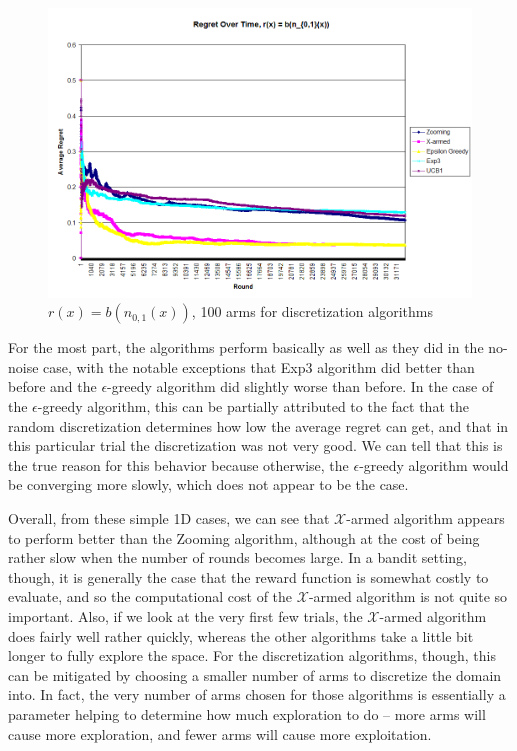 \begin{figure}[!ht]
  \begin{center}
    \includegraphics[width=\figwidth]{figures/1dnoiseplot.png}
     \caption{$r(x) = b(n_{0,1}(x))$, 100 arms for discretization
     algorithms}
     \label{fig:1dnoise}
  \end{center}
\end{figure}

For the most part, the algorithms perform basically as well as they did
in the no-noise case, with the notable exceptions that Exp3 algorithm did
better than before and the $\epsilon$-greedy algorithm did slightly worse
than before.  In the case of the $\epsilon$-greedy algorithm, this can be
partially attributed to the fact that the random discretization determines
how low the average regret can get, and that in this particular trial
the discretization was not very good.  We can tell that this is the true
reason for this behavior because otherwise, the $\epsilon$-greedy algorithm
would be converging more slowly, which does not appear to be the case.

Overall, from these simple 1D cases, we can see that
$\mathcal{X}$-armed algorithm appears to perform better than the Zooming
algorithm, although at the cost of being rather slow when the number of
rounds becomes large.  In a bandit setting, though, it is generally the
case that the reward function is somewhat costly to evaluate, and so the
computational cost of the $\mathcal{X}$-armed algorithm is not quite so
important.  Also, if we look at the very first few trials, the
$\mathcal{X}$-armed algorithm does fairly well rather quickly, whereas
the other algorithms take a little bit longer to fully explore the space.
For the discretization algorithms, though, this can be mitigated by
choosing a smaller number of arms to discretize the domain into.  In fact,
the very number of arms chosen for those algorithms is essentially a 
parameter helping to determine how much exploration to do -- more arms
will cause more exploration, and fewer arms will cause more exploitation.

